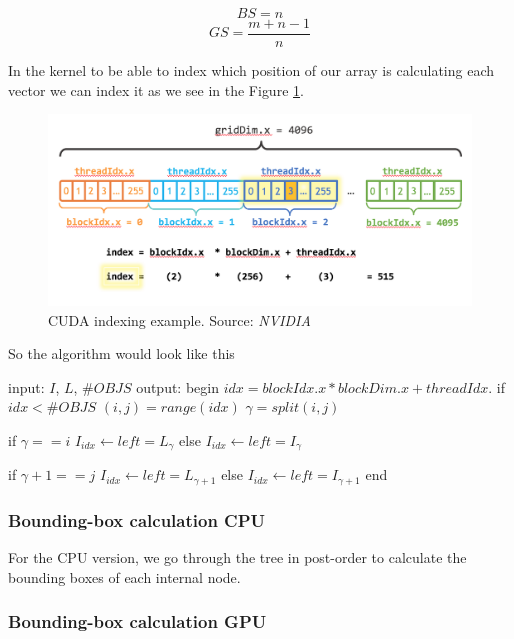 \documentclass[titlepage,12pt]{report}
\begin{document}
$$
BS = n
$$
$$
GS = \frac{m + n - 1}{n}
$$

In the kernel to be able to index which position of our array is calculating each vector we can index it as we see in the Figure \ref{indexing}.

\begin{figure}[H]
	\centering
	\includegraphics[scale=0.45]{media/cuda_indexing.png}
	\caption{CUDA indexing example. Source: \textit{NVIDIA}}
	\label{indexing}
\end{figure}

So the algorithm would look like this

\begin{algorithm}[caption={BVH construction GPU - parallel}, label={gpu_par_bvh}]
input: $I$, $L$, $\#OBJS$
output:
begin
  $idx = blockIdx.x * blockDim.x + threadIdx.$ 
  if $idx < \#OBJS$
    $(i,j) = range(idx)$
    $\gamma = split(i,j)$
    
    if $ \gamma == i $
      $I_{idx} \leftarrow left = L_{\gamma}$
    else 
      $I_{idx} \leftarrow left = I_{\gamma}$
    
    if $ \gamma+1 == j $
      $I_{idx} \leftarrow left = L_{\gamma+1}$
    else 
      $I_{idx} \leftarrow left = I_{\gamma+1}$
end
\end{algorithm}

\subsubsection{Bounding-box calculation CPU}

For the CPU version, we go through the tree in post-order to calculate the bounding boxes of each internal node. 

\subsubsection{Bounding-box calculation GPU}
\end{document}
